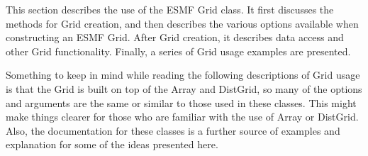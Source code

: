 
This section describes the use of the ESMF Grid class. It first discusses
the methods for Grid creation, and then describes the various options 
available when constructing an ESMF Grid. After Grid creation, it describes
data access and other Grid functionality. Finally, a series of Grid
usage examples are presented. 

  Something to keep in mind while reading the following descriptions of Grid usage is that 
the Grid is built on top of the Array and DistGrid, so many of the 
options and arguments are the same or similar to those used in these classes.
This might make things clearer for those who are familiar
with the use of Array or DistGrid.  Also, the documentation for these classes 
is a further source of examples and explanation for some of the ideas presented here. 



 









